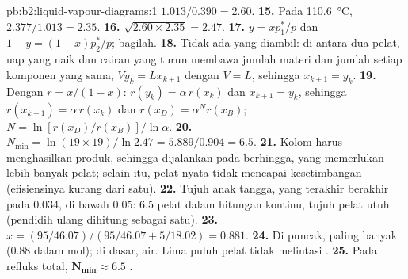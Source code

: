 \begin{solution}{pb:b2:liquid-vapour-diagrams:1}
$1.013/0.390 =
2.60$.
\textbf{15.} Pada \qty{110.6}{\degreeCelsius}, $2.377/1.013 = 2.35$.
\textbf{16.} $\sqrt{2.60 \times 2.35} = 2.47$.
\textbf{17.} $y = xp_1^*/p$ dan $1 - y = (1 - x)p_2^*/p$; bagilah.
\textbf{18.} Tidak ada yang diambil: di antara dua pelat, uap yang naik dan
cairan yang turun membawa jumlah materi dan jumlah setiap komponen yang
sama, $V y_k = L x_{k+1}$ dengan $V = L$, sehingga $x_{k+1} = y_k$.
\textbf{19.} Dengan $r = x/(1 - x)$: $r(y_k) = \alpha\,r(x_k)$ dan
$x_{k+1} = y_k$, sehingga $r(x_{k+1}) = \alpha\,r(x_k)$ dan
$r(x_D) = \alpha^N r(x_B)$; $N = \ln[r(x_D)/
r(x_B)]/\ln\alpha$.
\textbf{20.} $N_{\min} = \ln(19 \times 19)/\ln 2.47 = 5.889/0.904 = 6.5$.
\textbf{21.} Kolom harus menghasilkan produk, sehingga dijalankan pada  berhingga, yang memerlukan lebih banyak pelat; selain itu, pelat
nyata tidak mencapai kesetimbangan (efisiensinya kurang dari satu).
\textbf{22.} Tujuh anak tangga, yang terakhir berakhir pada 0.034, di bawah
0.05: 6.5 pelat dalam hitungan kontinu, tujuh pelat utuh (pendidih ulang
dihitung sebagai satu).
\textbf{23.} $x = (95/46.07)/(95/46.07 + 5/18.02) = 0.881$.
\textbf{24.} Di puncak, paling banyak  (0.88 dalam mol); di dasar,
air. Lima puluh pelat tidak melintasi .
\textbf{25.} Pada refluks total, $\boldsymbol{N_{\min} \approx 6.5}$ .
\end{solution}
